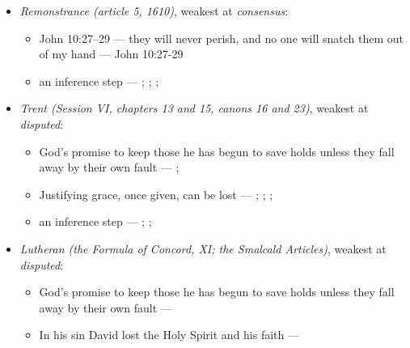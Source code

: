 \documentclass[11pt]{article}
\begin{document}
\begin{itemize}
\begin{itemize}
\item an inference step --- \cite[444--445]{wesley-works-9-1827}; \cite[415--416]{calvin-commentary-john-1847}; \cite[Solid Declaration XI.45]{concordia-triglotta-1921}
\item an inference step --- \cite[Trent, Session VI (1547), ch. 13]{tanner-decrees-1990}; \cite[40]{waterworth-trent-1848}; \cite[Solid Declaration XI.42]{concordia-triglotta-1921}
\end{itemize}
\item \emph{Remonstrance (article 5, 1610)}, weakest at \emph{consensus}:
\begin{itemize}
\item John 10:27–29 — they will never perish, and no one will snatch them out of my hand --- John 10:27-29
\item an inference step --- \cite[548--549]{schaff-creeds-christendom-3-1977}; \cite[603]{arminius-works-1-1825}; \cite[Solid Declaration XI.45]{concordia-triglotta-1921}; \cite[444--445]{wesley-works-9-1827}
\end{itemize}
\item \emph{Trent (Session VI, chapters 13 and 15, canons 16 and 23)}, weakest at \emph{disputed}:
\begin{itemize}
\item God’s promise to keep those he has begun to save holds unless they fall away by their own fault --- \cite[Trent, Session VI (1547), ch. 13]{tanner-decrees-1990}; \cite[40]{waterworth-trent-1848}
\item Justifying grace, once given, can be lost --- \cite[Trent, Session VI (1547), ch. 15]{tanner-decrees-1990}; \cite[42]{waterworth-trent-1848}; \cite[Trent, Session VI (1547), canon 23]{tanner-decrees-1990}; \cite[47]{waterworth-trent-1848}
\item an inference step --- \cite[329--330]{calvin-corinthians-1-1848}; \cite[Trent, Session VI (1547), ch. 13]{tanner-decrees-1990}; \cite[40--41]{waterworth-trent-1848}
\end{itemize}
\item \emph{Lutheran (the Formula of Concord, XI; the Smalcald Articles)}, weakest at \emph{disputed}:
\begin{itemize}
\item God’s promise to keep those he has begun to save holds unless they fall away by their own fault --- \cite[Solid Declaration XI.42]{concordia-triglotta-1921}
\item In his sin David lost the Holy Spirit and his faith --- \cite[Smalcald Articles III.iii.43]{concordia-triglotta-1921}

\end{itemize}
\end{itemize}
\end{document}
